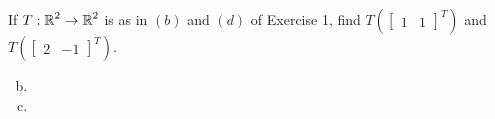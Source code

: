 \documentclass[../main.tex]{subfiles}
\begin{document}
If $T: \operatorname{\mathbb{R}}^2 \to \operatorname{\mathbb{R}}^2$ is as in $(b)$ and $(d)$ of Exercise 1, find $T(\begin{bmatrix}1&1\end{bmatrix}^T)$ and $T(\begin{bmatrix}2&-1\end{bmatrix}^T)$.

\solution
\begin{enumerate}[a)]
	\setcounter{enumi}{1}
	\item 
	\setcounter{enumi}{3}
	\item 
\end{enumerate}
\end{document}
